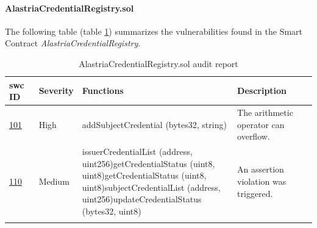 \documentclass[a4paper, 12pt]{article} %
\begin{document}
            \paragraph{AlastriaCredentialRegistry.sol}
                The following table (table \ref{tab:AlastriaCredentialRegistry}) summarizes the vulnerabilities found in the Smart Contract \textit{AlastriaCredentialRegistry}.
                \begin{longtable}{||p{0.1\linewidth} | p{0.11\linewidth} | p{0.52\linewidth} | p{0.3\linewidth}||}
                    \hline
                    \textbf{\acrshort{swc} ID} & \textbf{Severity} & \textbf{Functions} & \textbf{Description} \\ [0.5ex] 
                    \hline\hline
                    \href{https://swcregistry.io/docs/SWC-101}{101} & High & addSubjectCredential (bytes32, string) & The arithmetic operator can overflow.\\ 
                    \hline
                    \href{https://swcregistry.io/docs/SWC-110}{110} & Medium & issuerCredentialList (address, uint256)\newline getCredentialStatus (uint8, uint8)\newline getCredentialStatus (uint8, uint8)\newline subjectCredentialList (address, uint256)\newline updateCredentialStatus (bytes32, uint8)\newline & An assertion violation was triggered.\\ [1ex] 
                    \hline
                    \caption{AlastriaCredentialRegistry.sol audit report}
                    \label{tab:AlastriaCredentialRegistry}
                \end{longtable}

            \newpage
\end{document}
